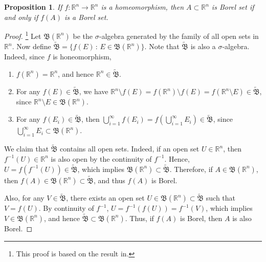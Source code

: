 \documentclass[11pt]{book}
\newtheorem{proposition}{Proposition}[chapter]
\theoremstyle{definition}
\numberwithin{equation}{chapter}
\def\BB{\mathfrak{B}}
\begin{document}
\begin{proposition}\label{proposition_110}
If $f:\mathbb{R}^n \to \mathbb{R}^n$ is a homeomorphism, then $A \subset \mathbb{R}^n$ is Borel set if and only if $f(A)$ is a Borel set.
\end{proposition}
\begin{proof}\footnote{This proof is based on the result in\cite{18}.}
Let $\mathfrak{B}(\mathbb{R}^n)$ be the $\sigma$-algebra generated by the family of all open sets in $\mathbb{R}^n$. Now define $\widetilde{\mathfrak{B}} = \{f(E)\,:\,E \in \mathfrak{B}(\mathbb{R}^n)\}$. Note that $\widetilde{\mathfrak{B}}$ is also a $\sigma$-algebra. Indeed, since $f$ is honeomorphism,
\begin{enumerate}[label=(\alph*)]
    \item $f(\mathbb{R}^n) = \mathbb{R}^n$, and hence $\mathbb{R}^n \in \widetilde{\mathfrak{B}}$.
        
    \item For any $f(E) \in \widetilde{\mathfrak{B}}$, we have $\mathbb{R}^n \setminus f(E) = f(\mathbb{R}^n) \setminus f(E) = f(\mathbb{R}^n \setminus E) \in \widetilde{\mathfrak{B}}$, since $\mathbb{R}^n \setminus E \in \mathfrak{B}(\mathbb{R}^n)$.
        
    \item For any $f(E_i) \in \widetilde{\mathfrak{B}}$, then $\bigcup^\infty_{i=1} f(E_i) = f \left( \bigcup^\infty_{i=1} E_i\right) \in \widetilde{\mathfrak{B}}$, since $\bigcup^\infty_{i=1} E_i \subset \BB(\mathbb{R}^n)$.
\end{enumerate}

We claim that $\widetilde{\mathfrak{B}}$ contains all open sets. Indeed, if an open set $U \in \mathbb{R}^n$, then $f^{-1}(U) \in \mathbb{R}^n$ is also open by the continuity of $f^{-1}$. Hence, $U = f\left(f^{-1}(U)\right) \in \widetilde{\mathfrak{B}}$, which implies $\mathfrak{B}(\mathbb{R}^n) \subset \widetilde{\mathfrak{B}}$. Therefore, if $A \in \mathfrak{B}(\mathbb{R}^n)$, then $f(A) \in \mathfrak{B}(\mathbb{R}^n) \subset \widetilde{\mathfrak{B}}$, and thus $f(A)$ is Borel.

Also, for any $V \in \widetilde{\mathfrak{B}}$, there exists an open set $U \in \mathfrak{B}(\mathbb{R}^n) \subset \widetilde{\mathfrak{B}}$ such that $V = f(U)$. By continuity of $f^{-1}$, $U = f^{-1}(f(U)) = f^{-1}(V)$, which implies $V \in \mathfrak{B}(\mathbb{R}^n)$, and hence $\widetilde{\mathfrak{B}} \subset \mathfrak{B}(\mathbb{R}^n)$. Thus, if $f(A)$ is Borel, then $A$ is also Borel.
\end{proof}
\end{document}
